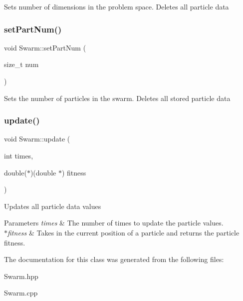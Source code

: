 Sets number of dimensions in the problem space. Deletes all particle data \mbox{\label{class_swarm_a94c68335146f6eaa39bc7648236ccc61}} 
\subsubsection{\texorpdfstring{set\+Part\+Num()}{setPartNum()}}
{\footnotesize\ttfamily void Swarm\+::set\+Part\+Num (\begin{DoxyParamCaption}\item[{size\+\_\+t}]{num }\end{DoxyParamCaption})}

Sets the number of particles in the swarm. Deletes all stored particle data \mbox{\label{class_swarm_ae2156e78f44bfd081fa6cf870dfdba81}} 
\subsubsection{\texorpdfstring{update()}{update()}}
{\footnotesize\ttfamily void Swarm\+::update (\begin{DoxyParamCaption}\item[{int}]{times,  }\item[{double($\ast$)(double $\ast$)}]{fitness }\end{DoxyParamCaption})}

Updates all particle data values 
\begin{DoxyParams}{Parameters}
{\em times} & The number of times to update the particle values. \\
\hline
{\em $\ast$fitness} & Takes in the current position of a particle and returns the particle fitness. \\
\hline
\end{DoxyParams}


The documentation for this class was generated from the following files\+:\begin{DoxyCompactItemize}
\item 
Swarm.\+hpp\item 
Swarm.\+cpp\end{DoxyCompactItemize}
